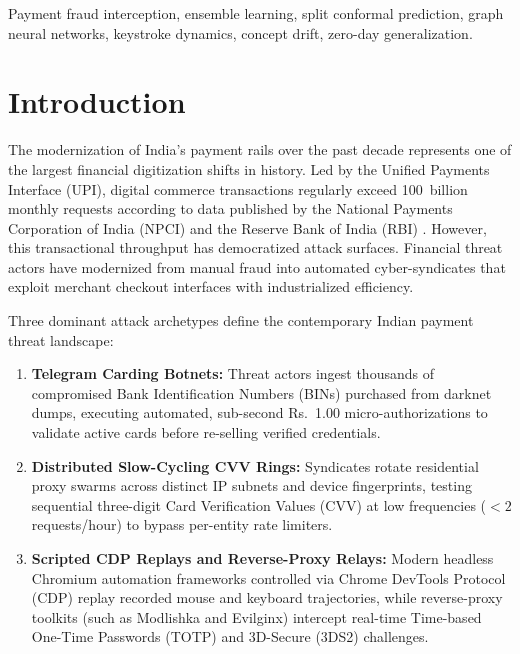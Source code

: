 \documentclass[conference]{IEEEtran}
\begin{document}
\begin{IEEEkeywords}
Payment fraud interception, ensemble learning, split conformal prediction, graph neural networks, keystroke dynamics, concept drift, zero-day generalization.
\end{IEEEkeywords}

\section{Introduction}
\label{sec:intro}

The modernization of India's payment rails over the past decade represents one of the largest financial digitization shifts in history. Led by the Unified Payments Interface (UPI), digital commerce transactions regularly exceed 100~billion monthly requests according to data published by the National Payments Corporation of India (NPCI) and the Reserve Bank of India (RBI) \cite{npci2024annual, rbi2024digital}. However, this transactional throughput has democratized attack surfaces. Financial threat actors have modernized from manual fraud into automated cyber-syndicates that exploit merchant checkout interfaces with industrialized efficiency.

Three dominant attack archetypes define the contemporary Indian payment threat landscape:
\begin{enumerate}
    \item \textbf{Telegram Carding Botnets:} Threat actors ingest thousands of compromised Bank Identification Numbers (BINs) purchased from darknet dumps, executing automated, sub-second Rs.~1.00 micro-authorizations to validate active cards before re-selling verified credentials.
    \item \textbf{Distributed Slow-Cycling CVV Rings:} Syndicates rotate residential proxy swarms across distinct IP subnets and device fingerprints, testing sequential three-digit Card Verification Values (CVV) at low frequencies ($<2$ requests/hour) to bypass per-entity rate limiters.
    \item \textbf{Scripted CDP Replays and Reverse-Proxy Relays:} Modern headless Chromium automation frameworks controlled via Chrome DevTools Protocol (CDP) replay recorded mouse and keyboard trajectories, while reverse-proxy toolkits (such as Modlishka and Evilginx) intercept real-time Time-based One-Time Passwords (TOTP) and 3D-Secure (3DS2) challenges.
\end{enumerate}
\end{document}

